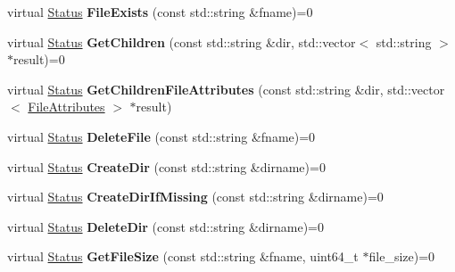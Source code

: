 \begin{DoxyCompactItemize}
\item 
virtual \hyperlink{classrocksdb_1_1Status}{Status} {\bfseries File\+Exists} (const std\+::string \&fname)=0\hypertarget{classrocksdb_1_1Env_a69c138d9c4fa957ebf3dd950849c6319}{}\label{classrocksdb_1_1Env_a69c138d9c4fa957ebf3dd950849c6319}

\item 
virtual \hyperlink{classrocksdb_1_1Status}{Status} {\bfseries Get\+Children} (const std\+::string \&dir, std\+::vector$<$ std\+::string $>$ $\ast$result)=0\hypertarget{classrocksdb_1_1Env_aebd6a4aac30704da29fecf45a9da21d6}{}\label{classrocksdb_1_1Env_aebd6a4aac30704da29fecf45a9da21d6}

\item 
virtual \hyperlink{classrocksdb_1_1Status}{Status} {\bfseries Get\+Children\+File\+Attributes} (const std\+::string \&dir, std\+::vector$<$ \hyperlink{structrocksdb_1_1Env_1_1FileAttributes}{File\+Attributes} $>$ $\ast$result)\hypertarget{classrocksdb_1_1Env_ace92872738ffb27bbe8d90a4c03a0746}{}\label{classrocksdb_1_1Env_ace92872738ffb27bbe8d90a4c03a0746}

\item 
virtual \hyperlink{classrocksdb_1_1Status}{Status} {\bfseries Delete\+File} (const std\+::string \&fname)=0\hypertarget{classrocksdb_1_1Env_a0d75747a2a64c041d106b85202848fe8}{}\label{classrocksdb_1_1Env_a0d75747a2a64c041d106b85202848fe8}

\item 
virtual \hyperlink{classrocksdb_1_1Status}{Status} {\bfseries Create\+Dir} (const std\+::string \&dirname)=0\hypertarget{classrocksdb_1_1Env_abb8c5907cacfd71bb223be17c4741a47}{}\label{classrocksdb_1_1Env_abb8c5907cacfd71bb223be17c4741a47}

\item 
virtual \hyperlink{classrocksdb_1_1Status}{Status} {\bfseries Create\+Dir\+If\+Missing} (const std\+::string \&dirname)=0\hypertarget{classrocksdb_1_1Env_a52a10880d70d77d1dcad9f2fb20ce171}{}\label{classrocksdb_1_1Env_a52a10880d70d77d1dcad9f2fb20ce171}

\item 
virtual \hyperlink{classrocksdb_1_1Status}{Status} {\bfseries Delete\+Dir} (const std\+::string \&dirname)=0\hypertarget{classrocksdb_1_1Env_a4dc62f49ff743af36746fb9c49edadda}{}\label{classrocksdb_1_1Env_a4dc62f49ff743af36746fb9c49edadda}

\item 
virtual \hyperlink{classrocksdb_1_1Status}{Status} {\bfseries Get\+File\+Size} (const std\+::string \&fname, uint64\+\_\+t $\ast$file\+\_\+size)=0\hypertarget{classrocksdb_1_1Env_afe49e988676094b54312ada4f927a26d}{}\label{classrocksdb_1_1Env_afe49e988676094b54312ada4f927a26d}


\end{DoxyCompactItemize}
